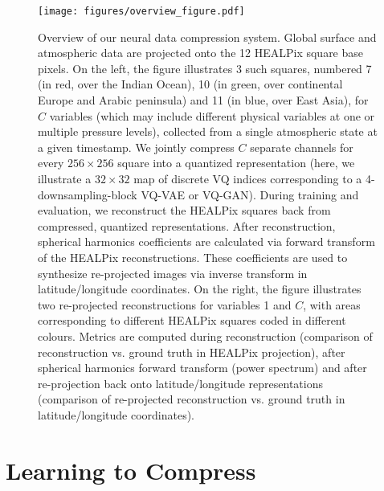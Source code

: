 \documentclass[11pt, a4paper, logo, copyright, numbering]{googledeepmind}
\begin{document}
\begin{figure}
    \centering
    \texttt{[image: figures/overview\_figure.pdf]}
    \hfill
    \caption{Overview of our neural data compression system. Global surface and atmospheric data are projected onto the 12 HEALPix square base pixels. On the left, the figure illustrates 3 such squares, numbered 7 (in red, over the Indian Ocean), 10 (in green, over continental Europe and Arabic peninsula) and 11 (in blue, over East Asia), for $C$ variables (which may include different physical variables at one or multiple pressure levels), collected from a single atmospheric state at a given timestamp. We jointly compress $C$ separate channels for every $256 \times 256$ square into a quantized representation (here, we illustrate a $32 \times 32$ map of discrete VQ indices corresponding to a 4-downsampling-block VQ-VAE or VQ-GAN). During training and evaluation, we reconstruct the HEALPix squares back from compressed, quantized representations. After reconstruction, spherical harmonics coefficients are calculated via forward transform of the HEALPix reconstructions. These coefficients are used to synthesize re-projected images via inverse transform in latitude/longitude coordinates. On the right, the figure illustrates two re-projected reconstructions for variables 1 and $C$, with areas corresponding to different HEALPix squares coded in different colours. Metrics are computed during reconstruction (comparison of reconstruction vs. ground truth in HEALPix projection), after spherical harmonics forward transform (power spectrum) and after re-projection back onto latitude/longitude representations (comparison of re-projected reconstruction vs. ground truth in latitude/longitude coordinates).}
    \label{fig:system}
\end{figure}


 
\section{Learning to Compress}
\label{sx:learning2compress}
\end{document}
